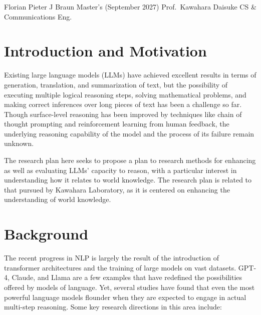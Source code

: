
\makeplanheader
    {Florian Pieter J Braun}
    {Master's (September 2027)}
    {Prof.\ Kawahara Daisuke}
    {CS \& Communications Eng.}


\section{Introduction and Motivation}

Existing large language models (LLMs) have achieved excellent results in terms of generation, translation, and summarization of text, but the possibility of executing multiple logical reasoning steps, solving mathematical problems, and making correct inferences over long pieces of text has been a challenge so far. Though surface-level reasoning has been improved by techniques like chain of thought prompting and reinforcement learning from human feedback, the underlying reasoning capability of the model and the process of its failure remain unknown.

The research plan here seeks to propose a plan to research methods for enhancing as well as evaluating LLMs' capacity to reason, with a particular interest in understanding how it relates to world knowledge. The research plan is related to that pursued by Kawahara Laboratory, as it is centered on enhancing the understanding of world knowledge.

\section{Background}

The recent progress in NLP is largely the result of the introduction of transformer architectures and the training of large models on vast datasets. GPT-4, Claude, and Llama are a few examples that have redefined the possibilities offered by models of language. Yet, several studies have found that even the most powerful language models flounder when they are expected to engage in actual multi-step reasoning. Some key research directions in this area include:


